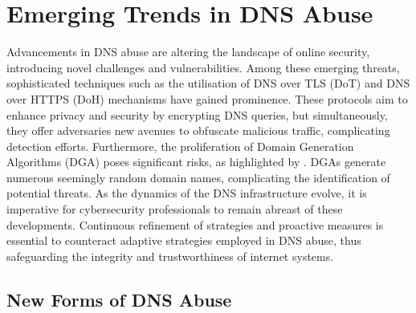 \section{Emerging Trends in DNS Abuse}

Advancements in DNS abuse are altering the landscape of online security, introducing novel challenges and vulnerabilities. Among these emerging threats, sophisticated techniques such as the utilisation of DNS over TLS (DoT) and DNS over HTTPS (DoH) mechanisms have gained prominence. These protocols aim to enhance privacy and security by encrypting DNS queries, but simultaneously, they offer adversaries new avenues to obfuscate malicious traffic, complicating detection efforts. Furthermore, the proliferation of Domain Generation Algorithms (DGA) poses significant risks, as highlighted by \cite{kapoor2021ransomware}.  DGAs generate numerous seemingly random domain names, complicating the identification of potential threats. As the dynamics of the DNS infrastructure evolve, it is imperative for cybersecurity professionals to remain abreast of these developments. Continuous refinement of strategies and proactive measures is essential to counteract adaptive strategies employed in DNS abuse, thus safeguarding the integrity and trustworthiness of internet systems.

\subsection{New Forms of DNS Abuse}

